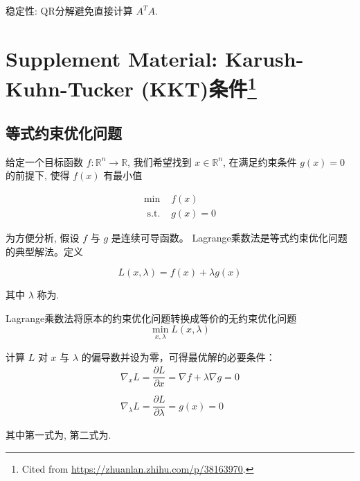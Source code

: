 稳定性: QR分解避免直接计算 $ A^{T} {A}$.

\section[Supplement Material: Karush-Kuhn-Tucker (KKT)条件]{Supplement Material: Karush-Kuhn-Tucker (KKT)条件\footnote{Cited from \url{https://zhuanlan.zhihu.com/p/38163970}.}}

\subsection{等式约束优化问题}

\begin{problem}[等式约束优化问题]
    给定一个目标函数 $ f: \mathbb{R}^{n} \rightarrow \mathbb{R} $, 我们希望找到 $ {x} \in \mathbb{R}^{n} $, 在满足约束条件 $ g({x})=0 $ 的前提下, 使得 $ f({x}) $ 有最小值

    $$
\begin{array}{ll}
\min & f({x}) \\
\text { s.t. } & g({x})=0
\end{array}
$$
\end{problem}

为方便分析, 假设 $ f $ 与 $ g $ 是连续可导函数。 Lagrange乘数法是等式约束优化问题的典型解法。定义

\begin{definition}[Lagrangian函数]
    $$
L({x}, \lambda)=f({x})+\lambda g({x})
$$
\end{definition}

其中 $ \lambda $ 称为. 

\begin{theorem}
    Lagrange乘数法将原本的约束优化问题转换成等价的无约束优化问题
$$
\min _{{x}, \lambda} L({x}, \lambda)
$$
\end{theorem}

\begin{theorem}[拉格朗日乘子法最优解必要条件]
    计算 $ L $ 对 $ {x} $ 与 $ \lambda $ 的偏导数并设为零，可得最优解的必要条件：
$$
\begin{array}{l}
\nabla_{{x}} L=\dfrac{\partial L}{\partial {x}}=\nabla f+\lambda \nabla g={0} \\
\\
\nabla_{\lambda} L=\dfrac{\partial L}{\partial \lambda}=g({x})=0
\end{array}
$$

其中第一式为, 第二式为.
\end{theorem}


